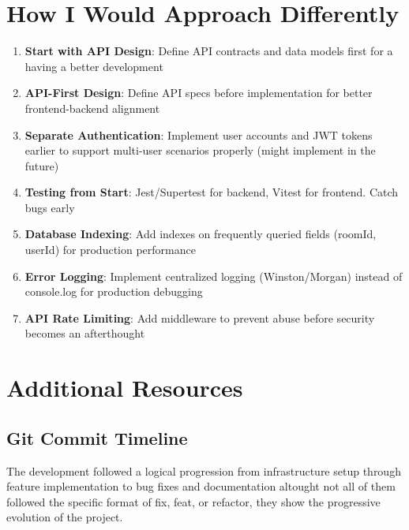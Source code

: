 \documentclass[11pt,a4paper]{article}
\begin{document}
\section{How I Would Approach Differently}

\begin{enumerate}
    \item \textbf{Start with API Design}: Define API contracts and data models first for a having a better development
    \item \textbf{API-First Design}: Define API specs before implementation for better frontend-backend alignment
    \item \textbf{Separate Authentication}: Implement user accounts and JWT tokens earlier to support multi-user scenarios properly (might implement in the future)
    \item \textbf{Testing from Start}: Jest/Supertest for backend, Vitest for frontend. Catch bugs early
    \item \textbf{Database Indexing}: Add indexes on frequently queried fields (roomId, userId) for production performance
    \item \textbf{Error Logging}: Implement centralized logging (Winston/Morgan) instead of console.log for production debugging
    \item \textbf{API Rate Limiting}: Add middleware to prevent abuse before security becomes an afterthought
\end{enumerate}

\appendix

\section{Additional Resources}

\subsection{Git Commit Timeline}

The development followed a logical progression from infrastructure setup through feature implementation to bug fixes and documentation altought not all of them followed the specific format of fix, feat, or refactor, they show the progressive evolution of the project.
\end{document}
